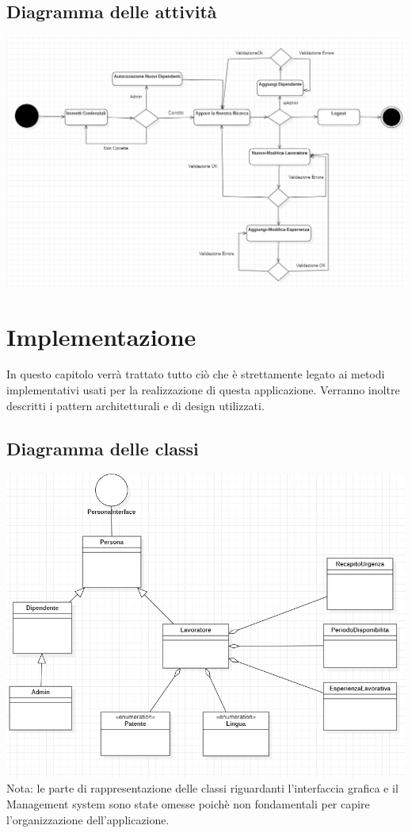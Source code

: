 \documentclass[ 4paper,11pt,openany]{book}
\begin{document}
\section{Diagramma delle attività}
\includegraphics[width=185mm]{attivita.png}


\chapter{Implementazione}
In questo capitolo verrà trattato tutto ciò che è strettamente legato ai metodi implementativi usati per la realizzazione di questa applicazione. Verranno inoltre descritti i pattern architetturali e di design utilizzati.
\section{Diagramma delle classi}
\includegraphics[width=185mm]{classi.png}
Nota: le parte di rappresentazione delle classi riguardanti l'interfaccia grafica e il Management system sono state omesse poichè non fondamentali per capire l'organizzazione dell'applicazione.
\end{document}
